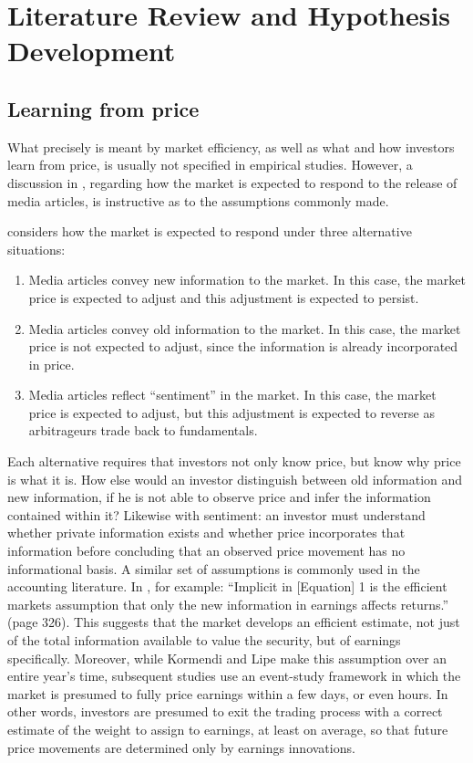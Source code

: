 \documentclass[11pt]{article}
\begin{document}
\section{Literature Review and Hypothesis Development}
\label{sec:orga9be873}
\subsection{Learning from price}
\label{sec:orgfb6dcb7}
What precisely is meant by market efficiency, as well as what and how investors learn from price, is usually not specified in empirical studies. However, a discussion in \citet{tetlockGivingContentInvestor2007}, regarding how the market is expected to respond to the release of media articles, is instructive as to the assumptions commonly made.

\citet{tetlockGivingContentInvestor2007} considers how the market is expected to respond under three alternative situations:
\begin{enumerate}
\item Media articles convey new information to the market. In this case, the market price is expected to adjust and this adjustment is expected to persist.
\item Media articles convey old information to the market. In this case, the market price is not expected to adjust, since the information is already incorporated in price.
\item Media articles reflect ``sentiment'' in the market. In this case, the market price is expected to adjust, but this adjustment is expected to reverse as arbitrageurs trade back to fundamentals.
\end{enumerate}
Each alternative requires that investors not only know price, but know why price is what it is. How else would an investor distinguish between old information and new information, if he is not able to observe price and infer the information contained within it? Likewise with sentiment: an investor must understand whether private information exists and whether price incorporates that information before concluding that an observed price movement has no informational basis. A similar set of assumptions is commonly used in the accounting literature. In \citet{kormendiEarningsInnovationsEarnings1987}, for example: ``Implicit in [Equation] 1 is the efficient markets assumption that only the new information in earnings affects returns.'' (page 326). This suggests that the market develops an efficient estimate, not just of the total information available to value the security, but of earnings specifically. Moreover, while Kormendi and Lipe make this assumption over an entire year's time, subsequent studies use an event-study framework in which the market is presumed to fully price earnings within a few days, or even hours. In other words, investors are presumed to exit the trading process with a correct estimate of the weight to assign to earnings, at least on average, so that future price movements are determined only by earnings innovations. 
\end{document}
